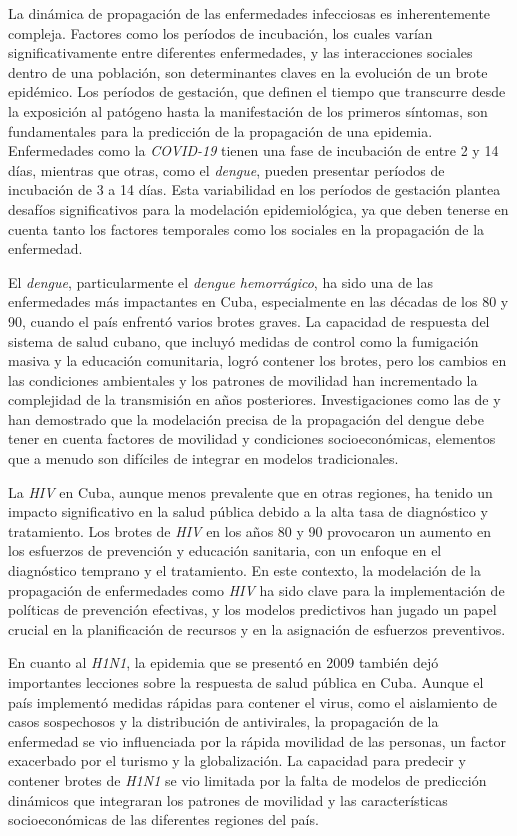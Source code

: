 La dinámica de propagación de las enfermedades infecciosas es inherentemente compleja. Factores como los períodos de incubación, los cuales varían significativamente entre diferentes enfermedades, y las interacciones sociales dentro de una población, son determinantes claves en la evolución de un brote epidémico. Los períodos de gestación, que definen el tiempo que transcurre desde la exposición al patógeno hasta la manifestación de los primeros síntomas, son fundamentales para la predicción de la propagación de una epidemia. Enfermedades como la \textit{COVID-19} tienen una fase de incubación de entre 2 y 14 días, mientras que otras, como el \textit{dengue}, pueden presentar períodos de incubación de 3 a 14 días. Esta variabilidad en los períodos de gestación plantea desafíos significativos para la modelación epidemiológica, ya que deben tenerse en cuenta tanto los factores temporales como los sociales en la propagación de la enfermedad.

El \textit{dengue}, particularmente el \textit{dengue hemorrágico}, ha sido una de las enfermedades más impactantes en Cuba, especialmente en las décadas de los 80 y 90, cuando el país enfrentó varios brotes graves. La capacidad de respuesta del sistema de salud cubano, que incluyó medidas de control como la fumigación masiva y la educación comunitaria, logró contener los brotes, pero los cambios en las condiciones ambientales y los patrones de movilidad han incrementado la complejidad de la transmisión en años posteriores. Investigaciones como las de \textcite{valdes2002impacto} y \textcite{kouri1986dengue} han demostrado que la modelación precisa de la propagación del dengue debe tener en cuenta factores de movilidad y condiciones socioeconómicas, elementos que a menudo son difíciles de integrar en modelos tradicionales.

La \textit{HIV} en Cuba, aunque menos prevalente que en otras regiones, ha tenido un impacto significativo en la salud pública debido a la alta tasa de diagnóstico y tratamiento. Los brotes de \textit{HIV} en los años 80 y 90 provocaron un aumento en los esfuerzos de prevención y educación sanitaria, con un enfoque en el diagnóstico temprano y el tratamiento. En este contexto, la modelación de la propagación de enfermedades como \textit{HIV} ha sido clave para la implementación de políticas de prevención efectivas, y los modelos predictivos han jugado un papel crucial en la planificación de recursos y en la asignación de esfuerzos preventivos.

En cuanto al \textit{H1N1}, la epidemia que se presentó en 2009 también dejó importantes lecciones sobre la respuesta de salud pública en Cuba. Aunque el país implementó medidas rápidas para contener el virus, como el aislamiento de casos sospechosos y la distribución de antivirales, la propagación de la enfermedad se vio influenciada por la rápida movilidad de las personas, un factor exacerbado por el turismo y la globalización. La capacidad para predecir y contener brotes de \textit{H1N1} se vio limitada por la falta de modelos de predicción dinámicos que integraran los patrones de movilidad y las características socioeconómicas de las diferentes regiones del país.

